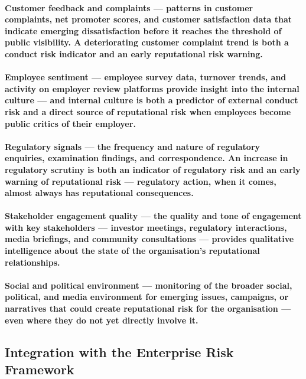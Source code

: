 \paragraph{\textbf{Customer feedback and complaints} — patterns in customer complaints, net promoter scores, and customer satisfaction data that indicate emerging dissatisfaction before it reaches the threshold of public visibility. A deteriorating customer complaint trend is both a conduct risk indicator and an early reputational risk warning.}
\paragraph{\textbf{Employee sentiment} — employee survey data, turnover trends, and activity on employer review platforms provide insight into the internal culture — and internal culture is both a predictor of external conduct risk and a direct source of reputational risk when employees become public critics of their employer.}
\paragraph{\textbf{Regulatory signals} — the frequency and nature of regulatory enquiries, examination findings, and correspondence. An increase in regulatory scrutiny is both an indicator of regulatory risk and an early warning of reputational risk — regulatory action, when it comes, almost always has reputational consequences.}
\paragraph{\textbf{Stakeholder engagement quality} — the quality and tone of engagement with key stakeholders — investor meetings, regulatory interactions, media briefings, and community consultations — provides qualitative intelligence about the state of the organisation's reputational relationships.}
\paragraph{\textbf{Social and political environment} — monitoring of the broader social, political, and media environment for emerging issues, campaigns, or narratives that could create reputational risk for the organisation — even where they do not yet directly involve it.}

\subsection{Integration with the Enterprise Risk Framework}
